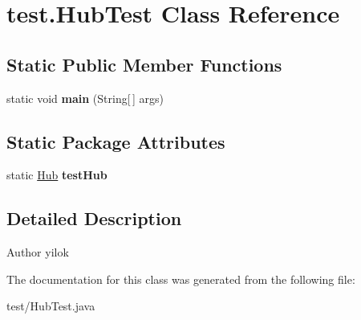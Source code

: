 \hypertarget{classtest_1_1_hub_test}{
\section{test.\-Hub\-Test \-Class \-Reference}
\label{classtest_1_1_hub_test}
}
\subsection*{\-Static \-Public \-Member \-Functions}
\begin{DoxyCompactItemize}
\item 
\hypertarget{classtest_1_1_hub_test_ac90e5d88a38edb5142b00795a555764c}{
static void {\bfseries main} (\-String\mbox{[}$\,$\mbox{]} args)}
\label{classtest_1_1_hub_test_ac90e5d88a38edb5142b00795a555764c}

\end{DoxyCompactItemize}
\subsection*{\-Static \-Package \-Attributes}
\begin{DoxyCompactItemize}
\item 
\hypertarget{classtest_1_1_hub_test_a9fe3f3aa5ebe46cf09da5ec565c9fa13}{
static \hyperlink{classhub_1_1_hub}{\-Hub} {\bfseries test\-Hub}}
\label{classtest_1_1_hub_test_a9fe3f3aa5ebe46cf09da5ec565c9fa13}

\end{DoxyCompactItemize}


\subsection{\-Detailed \-Description}
\begin{DoxyAuthor}{\-Author}
yilok 
\end{DoxyAuthor}


\-The documentation for this class was generated from the following file\-:\begin{DoxyCompactItemize}
\item 
test/\-Hub\-Test.\-java\end{DoxyCompactItemize}
